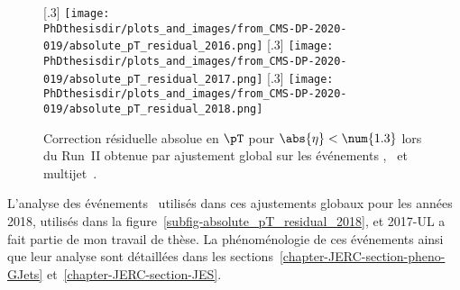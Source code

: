 \begin{figure}[h]
\centering
{}[.3\textwidth]
{\texttt{[image: \\PhDthesisdir/plots\_and\_images/from\_CMS-DP-2020-019/absolute\_pT\_residual\_2016.png]}}
\hfill
{}[.3\textwidth]
{\texttt{[image: \\PhDthesisdir/plots\_and\_images/from\_CMS-DP-2020-019/absolute\_pT\_residual\_2017.png]}}
\hfill
{}[.3\textwidth]
{\texttt{[image: \\PhDthesisdir/plots\_and\_images/from\_CMS-DP-2020-019/absolute\_pT\_residual\_2018.png]}}
\caption[Correction résiduelle absolue en $\pT$ pour $\abs{\eta}<\num{1.3}$ lors du Run~II.]{Correction résiduelle absolue en $\pT$ pour $\abs{\eta}<\num{1.3}$ lors du Run~II obtenue par ajustement global sur les événements \Gjets, \Zjets\ et multijet~\cite{CMS-DP-2020-019}.}
\label{fig-L3ResAbs_RunII}
\end{figure}
\par L'analyse des événements \Gjets\ utilisés dans ces ajustements globaux pour les années 2018, utilisés dans la figure~\ref{subfig-absolute_pT_residual_2018}, et 2017-UL a fait partie de mon travail de thèse.
La phénoménologie de ces événements ainsi que leur analyse sont détaillées dans les sections~\ref{chapter-JERC-section-pheno-GJets} et~\ref{chapter-JERC-section-JES}.
\newpage
